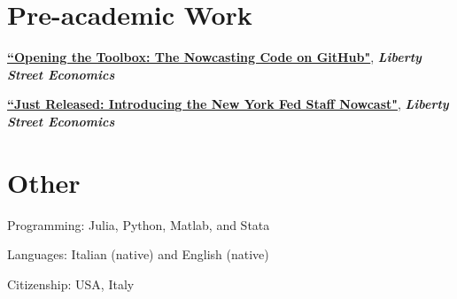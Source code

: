 \documentclass[margin,line]{res}                          %
\newenvironment{list1}{
	\begin{list}{\ding{113}}{%
			\setlength{\itemsep}{0in}
			\setlength{\parsep}{0in} \setlength{\parskip}{0in}
			\setlength{\topsep}{0in} \setlength{\partopsep}{0in}
			\setlength{\leftmargin}{0.17in}}}{\end{list}}
\begin{document}
\begin{resume}
	\section{\sc Pre-academic Work} 
	\begin{list1}
		\item[] \href{https://libertystreeteconomics.newyorkfed.org/2018/08/opening-the-toolbox-the-nowcasting-code-on-github/}{\textbf{``Opening the Toolbox: The Nowcasting Code on GitHub"}}, \textit{\textbf{Liberty Street Economics}}  \smallskip
		\item[] \href{https://libertystreeteconomics.newyorkfed.org/2016/04/just-released-introducing-the-frbny-nowcast/}{\textbf{``Just Released: Introducing the New York Fed Staff Nowcast"}}, \textit{\textbf{Liberty Street Economics}} \smallskip            
	\end{list1}
	
	\section{\sc Other}
	\begin{list1}
		\item[] Programming: Julia, Python, Matlab, and Stata \smallskip
		\item[] Languages: Italian (native) and English (native) \smallskip
		\item[] Citizenship: USA, Italy \smallskip
	\end{list1}
	
	
	
	
\end{resume}
\end{document}
